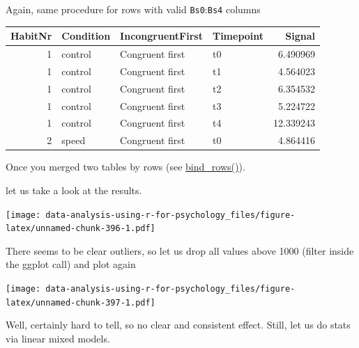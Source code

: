 \documentclass[
]{book}
\begin{document}
Again, same procedure for rows with valid \texttt{Bs0}:\texttt{Bs4} columns

\begin{tabular}{r|l|l|l|r}
\hline
HabitNr & Condition & IncongruentFirst & Timepoint & Signal\\
\hline
1 & control & Congruent first & t0 & 6.490969\\
\hline
1 & control & Congruent first & t1 & 4.564023\\
\hline
1 & control & Congruent first & t2 & 6.354532\\
\hline
1 & control & Congruent first & t3 & 5.224722\\
\hline
1 & control & Congruent first & t4 & 12.339243\\
\hline
2 & speed & Congruent first & t0 & 4.864416\\
\hline
\end{tabular}

Once you merged two tables by rows (see \href{https://dplyr.tidyverse.org/reference/bind.html}{bind\_rows()}).

let us take a look at the results.

\texttt{[image: data-analysis-using-r-for-psychology\_files/figure-latex/unnamed-chunk-396-1.pdf]}

There seems to be clear outliers, so let us drop all values above 1000 (filter inside the ggplot call) and plot again

\texttt{[image: data-analysis-using-r-for-psychology\_files/figure-latex/unnamed-chunk-397-1.pdf]}

Well, certainly hard to tell, so no clear and consistent effect. Still, let us do stats via linear mixed models.
\end{document}
